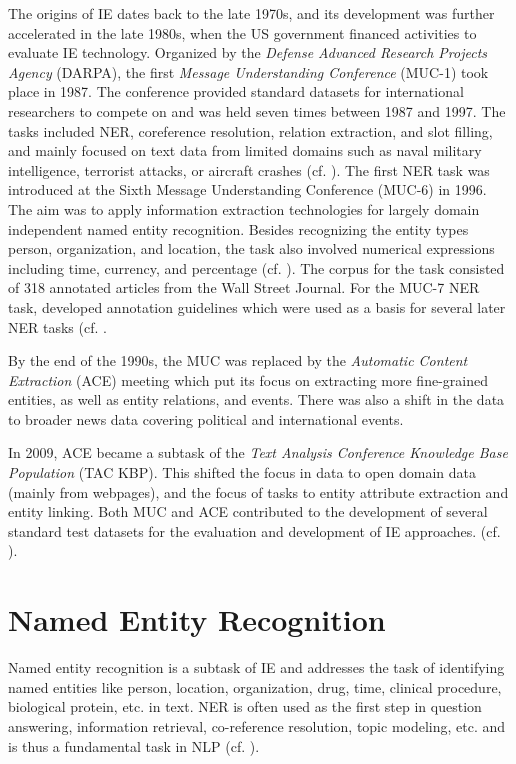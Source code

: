 The origins of IE dates back to the late 1970s, and its development was further accelerated in the late 1980s, when the US government financed activities to evaluate IE technology. Organized by the \textit{Defense Advanced Research Projects Agency} (DARPA), the first \textit{Message Understanding Conference} (MUC-1) took place in 1987. The conference provided standard datasets for international researchers to compete on and was held seven times between 1987 and 1997. The tasks included NER, coreference resolution, relation extraction, and slot filling, and mainly focused on text data from limited domains such as naval military intelligence, terrorist attacks, or aircraft crashes (cf. \cite[228]{zong_information_2021}). The first NER task was introduced at the Sixth Message Understanding Conference (MUC-6) in 1996. The aim was to apply information extraction technologies for largely domain independent named entity recognition. Besides recognizing the entity types person, organization, and location, the task also involved numerical expressions including time, currency, and percentage (cf. \cite{grishman_message_1996}). The corpus for the task consisted of 318 annotated articles  from the Wall Street Journal. 
For the MUC-7 NER task, \citeauthor{muc7_ner} developed annotation guidelines which were used as a basis for several later NER tasks (cf. \cite{muc7_ner}. 

By the end of the 1990s, the MUC was replaced by the \textit{Automatic Content Extraction} (ACE) meeting which put its focus on extracting more fine-grained entities, as well as entity relations, and events. There was also a shift in the data to broader news data covering political and international events. 

In 2009, ACE became a subtask of the \textit{Text Analysis Conference Knowledge Base Population} (TAC KBP). This shifted the focus in data to open domain data (mainly from webpages), and the focus of tasks to entity attribute extraction and entity linking. Both MUC and ACE contributed to the development of several standard test datasets for the evaluation and development of IE approaches. (cf. \cite[229]{zong_information_2021}). 


\section{Named Entity Recognition}

Named entity recognition is a subtask of IE and addresses the task of identifying named entities like person, location, organization, drug, time, clinical procedure, biological protein, etc. in text. NER is often used as the first step in question answering, information retrieval, co-reference resolution, topic modeling, etc. and is thus a fundamental task in NLP (cf. \cite{yadav_survey_2019}). 

